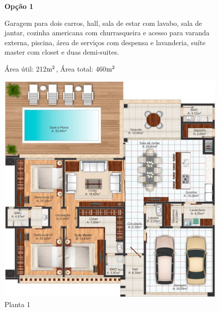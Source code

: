 \begin{figure}[h]
\textbf{Opção 1}

	Garagem para dois carros, hall, sala de estar com lavabo, sala de jantar, cozinha americana com churrasqueira e acesso para varanda externa, piscina, área de serviços com despensa e lavanderia, suíte master com closet e duas demi-suites.

Área útil: 212$\textup{m}^{2}$, Área total: 460$\textup{m}^{2}$

  \begin{center}
	\includegraphics[keepaspectratio,scale=0.45]{figuras/planta1.eps}
	\caption{Planta 1\cite{planta1}}
  \end{center}
\end{figure}

